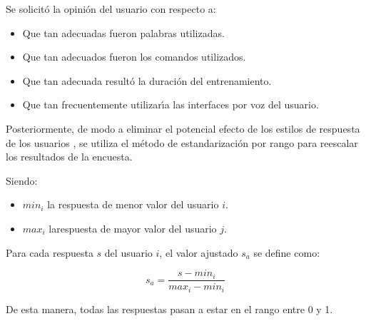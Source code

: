 Se solicit\'o la opini\'on del usuario con respecto a:
\begin{itemize}
	\item Que tan adecuadas fueron palabras utilizadas.
	\item Que tan adecuados fueron los comandos utilizados.
	\item Que tan adecuada result\'o la duraci\'on del entrenamiento.
	\item Que tan frecuentemente utilizar{\'\i}a las interfaces por voz del usuario.
\end{itemize}

Posteriormente, de modo a eliminar el potencial efecto de los estilos de respuesta
de los usuarios \cite{Fischer2010}, se utiliza el m\'etodo de estandarizaci\'on 
por rango \cite{Pagolu2011} para reescalar los resultados de la encuesta.

Siendo:
\begin{itemize}
	\item $min_i$ la respuesta de menor valor del usuario $i$.
	\item $max_i$ larespuesta de mayor valor del usuario $j$.
\end{itemize}

Para cada respuesta $s$ del usuario $i$, el valor ajustado $s_a$ se define como:

\begin{equation*}
s_a=\frac{s-min_i}{max_i-min_i}
\end{equation*}


De esta manera, todas las respuestas pasan a estar en el rango entre 0 y 1.  




